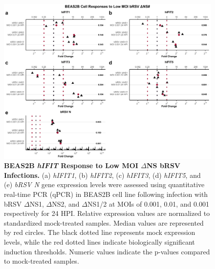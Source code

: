 \begin{figure}
    \centering
    \includegraphics[width=1\linewidth]{06. Chapter 1/Figs/01. Induction/12. beas2b_brsv_dns.pdf}
    \caption[BEAS2B \textit{hIFIT} Response to Low MOI \(\Delta\)NS bRSV Infections.]{\textbf{BEAS2B \textit{hIFIT} Response to Low MOI \(\Delta\)NS bRSV Infections.} (a) \textit{hIFIT1}, (b) \textit{hIFIT2}, (c) \textit{hIFIT3}, (d) \textit{hIFIT5}, and (e) \textit{bRSV N} gene expression levels were assessed using quantitative real-time PCR (qPCR) in BEAS2B cell line following infection with bRSV \(\Delta\)NS1, \(\Delta\)NS2, and \(\Delta\)NS1/2 at MOIs of 0.001, 0.01, and 0.001 respectively for 24 HPI. Relative expression values are normalized to standardized mock-treated samples. Median values are represented by red circles. The black dotted line represents mock expression levels, while the red dotted lines indicate biologically significant induction thresholds. Numeric values indicate the p-values compared to mock-treated samples.}
    \label{fig:BEAS2B responses to bRSV dNSs.}
\end{figure}

